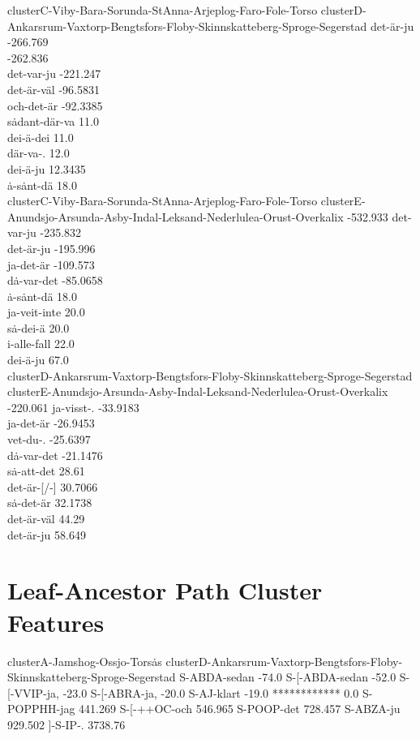 clusterC-Viby-Bara-Sorunda-StAnna-Arjeplog-Faro-Fole-Torso
clusterD-Ankarsrum-Vaxtorp-Bengtsfors-Floby-Skinnskatteberg-Sproge-Segerstad
det-\"ar-ju -266.769 \\
 -262.836 \\
det-var-ju -221.247 \\
det-\"ar-v\"al -96.5831 \\
och-det-\"ar -92.3385 \\
s\.adant-d\"ar-va 11.0 \\
dei-\"a-dei 11.0 \\
d\"ar-va-. 12.0 \\
dei-\"a-ju 12.3435 \\
\.a-s\.ant-d\"a 18.0 \\


clusterC-Viby-Bara-Sorunda-StAnna-Arjeplog-Faro-Fole-Torso
clusterE-Anundsjo-Arsunda-Asby-Indal-Leksand-Nederlulea-Orust-Overkalix
 -532.933
det-var-ju -235.832 \\
det-\"ar-ju -195.996 \\
ja-det-\"ar -109.573 \\
d\.a-var-det -85.0658 \\
\.a-s\.ant-d\"a 18.0 \\
ja-veit-inte 20.0 \\
s\.a-dei-\"a 20.0 \\
i-alle-fall 22.0 \\
dei-\"a-ju 67.0 \\


clusterD-Ankarsrum-Vaxtorp-Bengtsfors-Floby-Skinnskatteberg-Sproge-Segerstad
clusterE-Anundsjo-Arsunda-Asby-Indal-Leksand-Nederlulea-Orust-Overkalix
 -220.061
ja-visst-. -33.9183 \\
ja-det-\"ar -26.9453 \\
vet-du-. -25.6397 \\
d\.a-var-det -21.1476 \\
s\.a-att-det 28.61 \\
det-\"ar-[/-] 30.7066 \\
s\.a-det-\"ar 32.1738 \\
det-\"ar-v\"al 44.29 \\
det-\"ar-ju 58.649 \\

\section{Leaf-Ancestor Path Cluster Features}
clusterA-Jamshog-Ossjo-Tors\.as
clusterD-Ankarsrum-Vaxtorp-Bengtsfors-Floby-Skinnskatteberg-Sproge-Segerstad
S-ABDA-sedan -74.0
S-[-ABDA-sedan -52.0
S-[-VVIP-ja, -23.0
S-[-ABRA-ja, -20.0
S-AJ-klart -19.0
************ 0.0
S-POPPHH-jag 441.269
S-[-++OC-och 546.965
S-POOP-det 728.457
S-ABZA-ju 929.502
]-S-IP-. 3738.76

